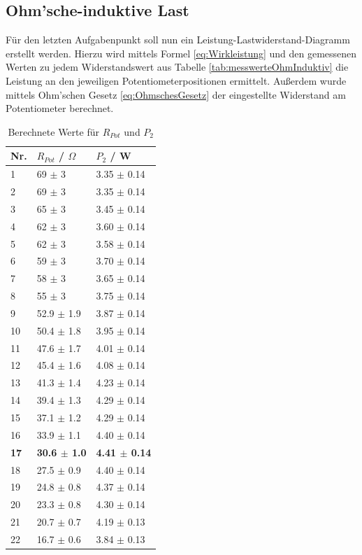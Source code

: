 \documentclass[12pt,a4paper,twoside]{article}
\begin{document}
\subsection{Ohm'sche-induktive Last}

Für den letzten Aufgabenpunkt soll nun ein Leistung-Lastwiderstand-Diagramm erstellt werden. Hierzu wird mittels Formel \ref{eq:Wirkleistung} und den gemessenen Werten zu jedem Widerstandswert aus Tabelle \ref{tab:messwerteOhmInduktiv} die Leistung an den jeweiligen Potentiometerpositionen ermittelt.
Außerdem wurde mittels Ohm'schen Gesetz \ref{eq:OhmschesGesetz} der eingestellte Widerstand am Potentiometer berechnet.

\begin{table}[H]
    \centering
    \caption{Berechnete Werte für $R_{Pot}$ und $P_{2}$}
    \label{tab:berechnungenRPotP2}
    \begin{tabular}{| l | l | l |}
        \hline
        Nr.  & $R_{Pot}$ / $\Omega$ & $P_{2}$ / W \\
        \hline
        1 & 69 $\pm$ 3 & 3.35 $\pm$ 0.14 \\
        2 & 69 $\pm$ 3 & 3.35 $\pm$ 0.14 \\
        3 & 65 $\pm$ 3 & 3.45 $\pm$ 0.14 \\
        4 & 62 $\pm$ 3 & 3.60 $\pm$ 0.14 \\
        5 & 62 $\pm$ 3 & 3.58 $\pm$ 0.14 \\
        6 & 59 $\pm$ 3 & 3.70 $\pm$ 0.14 \\
        7 & 58 $\pm$ 3 & 3.65 $\pm$ 0.14 \\
        8 & 55 $\pm$ 3 & 3.75 $\pm$ 0.14 \\
        9 & 52.9 $\pm$ 1.9 & 3.87 $\pm$ 0.14 \\
        10 & 50.4 $\pm$ 1.8 & 3.95 $\pm$ 0.14 \\
        11 & 47.6 $\pm$ 1.7 & 4.01 $\pm$ 0.14 \\
        12 & 45.4 $\pm$ 1.6 & 4.08 $\pm$ 0.14 \\
        13 & 41.3 $\pm$ 1.4 & 4.23 $\pm$ 0.14 \\
        14 & 39.4 $\pm$ 1.3 & 4.29 $\pm$ 0.14 \\
        15 & 37.1 $\pm$ 1.2 & 4.29 $\pm$ 0.14 \\
        16 & 33.9 $\pm$ 1.1 & 4.40 $\pm$ 0.14 \\
        \textbf{17} & \textbf{30.6 $\pm$ 1.0} & \textbf{4.41 $\pm$ 0.14} \\
        18 & 27.5 $\pm$ 0.9 & 4.40 $\pm$ 0.14 \\
        19 & 24.8 $\pm$ 0.8 & 4.37 $\pm$ 0.14 \\
        20 & 23.3 $\pm$ 0.8 & 4.30 $\pm$ 0.14 \\
        21 & 20.7 $\pm$ 0.7 & 4.19 $\pm$ 0.13 \\
        22 & 16.7 $\pm$ 0.6 & 3.84 $\pm$ 0.13 \\
        \hline
    \end{tabular}
\end{table}
\end{document}
